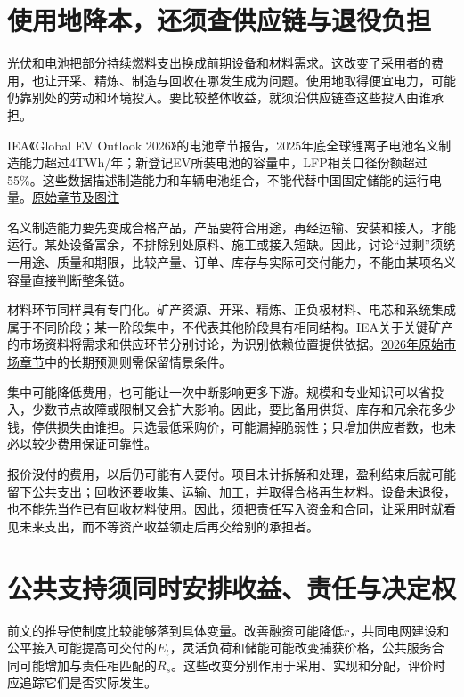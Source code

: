 \documentclass[UTF8,fontset=windows,12pt,a4paper,oneside,openany]{ctexbook}
\begin{document}
\section{使用地降本，还须查供应链与退役负担}

光伏和电池把部分持续燃料支出换成前期设备和材料需求。这改变了采用者的费用，也让开采、精炼、制造与回收在哪发生成为问题。使用地取得便宜电力，可能仍靠别处的劳动和环境投入。要比较整体收益，就须沿供应链查这些投入由谁承担。

IEA《Global EV Outlook 2026》的电池章节报告，2025年底全球锂离子电池名义制造能力超过4TWh/年；新登记EV所装电池的容量中，LFP相关口径份额超过55\%。这些数据描述制造能力和车辆电池组合，不能代替中国固定储能的运行电量。\href{https://www.iea.org/reports/global-ev-outlook-2026/electric-vehicle-batteries}{原始章节及图注}

名义制造能力要先变成合格产品，产品要符合用途，再经运输、安装和接入，才能运行。某处设备富余，不排除别处原料、施工或接入短缺。因此，讨论“过剩”须统一用途、质量和期限，比较产量、订单、库存与实际可交付能力，不能由某项名义容量直接判断整条链。

材料环节同样具有专门化。矿产资源、开采、精炼、正负极材料、电芯和系统集成属于不同阶段；某一阶段集中，不代表其他阶段具有相同结构。IEA关于关键矿产的市场资料将需求和供应环节分别讨论，为识别依赖位置提供依据。\href{https://www.iea.org/reports/global-critical-minerals-outlook-2026/market-overview}{2026年原始市场章节}中的长期预测则需保留情景条件。

集中可能降低费用，也可能让一次中断影响更多下游。规模和专业知识可以省投入，少数节点故障或限制又会扩大影响。因此，要比备用供货、库存和冗余花多少钱，停供损失由谁担。只选最低采购价，可能漏掉脆弱性；只增加供应者数，也未必以较少费用保证可靠性。

报价没付的费用，以后仍可能有人要付。项目未计拆解和处理，盈利结束后就可能留下公共支出；回收还要收集、运输、加工，并取得合格再生材料。设备未退役，也不能先当作已有回收材料使用。因此，须把责任写入资金和合同，让采用时就看见未来支出，而不等资产收益领走后再交给别的承担者。

\section{公共支持须同时安排收益、责任与决定权}

前文的推导使制度比较能够落到具体变量。改善融资可能降低\(r\)，共同电网建设和公平接入可能提高可交付的\(E_t\)，灵活负荷和储能可能改变捕获价格，公共服务合同可能增加与责任相匹配的\(R_s\)。这些改变分别作用于采用、实现和分配，评价时应追踪它们是否实际发生。
\end{document}
